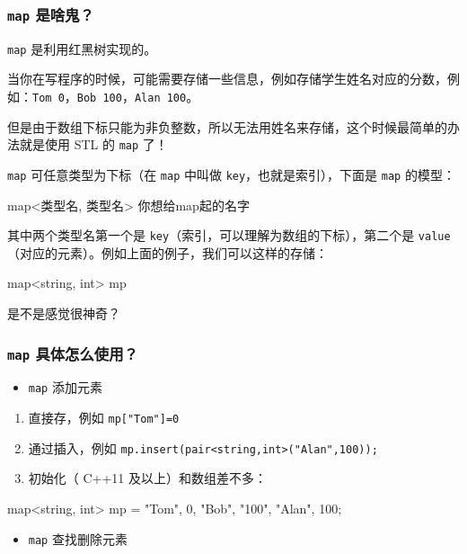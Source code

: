 
\subsubsection{\texttt{map} 是啥鬼？}

\texttt{map} 是利用红黑树实现的。

当你在写程序的时候，可能需要存储一些信息，例如存储学生姓名对应的分数，例如：\texttt{Tom 0}，\texttt{Bob 100}，\texttt{Alan 100}。

但是由于数组下标只能为非负整数，所以无法用姓名来存储，这个时候最简单的办法就是使用 STL 的 \texttt{map} 了！

\texttt{map} 可任意类型为下标（在 \texttt{map} 中叫做 \texttt{key}，也就是索引），下面是 \texttt{map} 的模型：

\begin{cppcode}
map<类型名, 类型名> 你想给map起的名字
\end{cppcode}

其中两个类型名第一个是 \texttt{key}（索引，可以理解为数组的下标），第二个是 \texttt{value}（对应的元素）。例如上面的例子，我们可以这样的存储：

\begin{cppcode}
map<string, int> mp
\end{cppcode}

是不是感觉很神奇？

\subsubsection{\texttt{map}  具体怎么使用？}

\begin{itemize}
\item \texttt{map} 添加元素
\end{itemize}

\begin{enumerate}
\item 直接存，例如 \texttt{mp["Tom"]=0}
\item 通过插入，例如 \texttt{mp.insert(pair<string,int>("Alan",100));}
\item 初始化（ C++11 及以上）和数组差不多：
\end{enumerate}

\begin{cppcode}
map<string, int> mp = {{"Tom", 0}, {"Bob", "100"}, {"Alan", 100}};
\end{cppcode}

\begin{itemize}
\item \texttt{map} 查找删除元素
\end{itemize}

